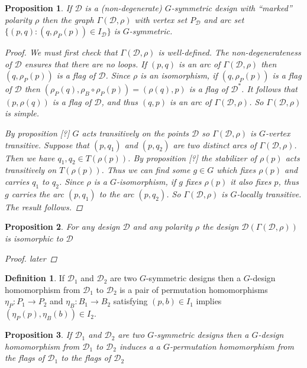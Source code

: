 \documentclass[12pt]{amsart}
\theoremstyle{plain}
\newtheorem{proposition}{Proposition}
\theoremstyle{definition}
\newtheorem{definition}{Definition}
\theoremstyle{remark}
\newcommand{\cD}{\mathcal{D}}
\begin{document}
\begin{proposition}
If $\cD$ is a (non-degenerate) $G$-symmetric design with ``marked'' polarity $\rho$
then the graph $\Gamma(\cD, \rho)$ with vertex set $P_\cD$ 
and arc set $\{ (p,q) : (q,\rho_P(p)) \in I_\cD \}$ is $G$-symmetric. 
\begin{proof}
We must first check that $\Gamma(\cD, \rho)$ is well-defined.
The non-degenerateness of $\cD$ ensures that there are no loops. 
If $(p,q)$ is an arc of $\Gamma(\cD, \rho)$
then $(q, \rho_P(p))$ is a flag of $\cD$.
Since $\rho$ is an isomorphism, 
if $(q, \rho_P(p))$ is a flag of $\cD$
then $(\rho_P(q), \rho_B \circ \rho_P(p)) = (\rho(q), p)$
is a flag of $\cD^{*}$.
It follows that $(p,\rho(q))$ is a flag of $\cD$,
and thus $(q,p)$ is an arc of $\Gamma(\cD, \rho)$.
So $\Gamma(\cD, \rho)$ is simple.

By proposition [?] $G$ acts transitively on the points $\cD$
so $\Gamma(\cD, \rho)$ is $G$-vertex transitive.
Suppose that $(p,q_1)$ and $(p,q_2)$ are two distinct arcs of
$\Gamma(\cD, \rho)$. Then we have $q_1, q_2 \in T(\rho(p))$.
By proposition [?] 
the stabilizer of $\rho(p)$ acts transitively on $T(\rho(p))$.
Thus we can find some $g \in G$ which fixes $\rho(p)$ and 
carries $q_1$ to $q_2$. 
Since $\rho$ is a $G$-isomorphism, if $g$ fixes $\rho(p)$
it also fixes $p$, thus $g$ carries the arc $(p,q_1)$
to the arc $(p,q_2)$. So $\Gamma(\cD, \rho)$ is $G$-locally
transitive. The result follows.

\end{proof}
\end{proposition}

\begin{proposition}
For any design $\cD$ and any polarity $\rho$ the design $\cD(\Gamma(\cD,\rho))$
is isomorphic to $\cD$
\begin{proof}
later
\end{proof}
\end{proposition}

\begin{definition}
If $\cD_1$ and $\cD_2$ are two $G$-symmetric designs
then a $G$-design homomorphism from $\cD_1$ to $\cD_2$
is a pair of permutation homomorphisms $\eta_P : P_1 \to P_2$ and $\eta_B : B_1 \to B_2$
satisfying $(p,b) \in I_1$ implies $(\eta_P(p),\eta_B(b)) \in I_2$. 
\end{definition}

\begin{proposition}
If $\cD_1$ and $\cD_2$ are two $G$-symmetric designs
then a $G$-design homomorphism from $\cD_1$ to $\cD_2$
induces a a $G$-permutation homomorphism from the flags of $\cD_1$ 
to the flags of $\cD_2$
\end{proposition}
\end{document}
